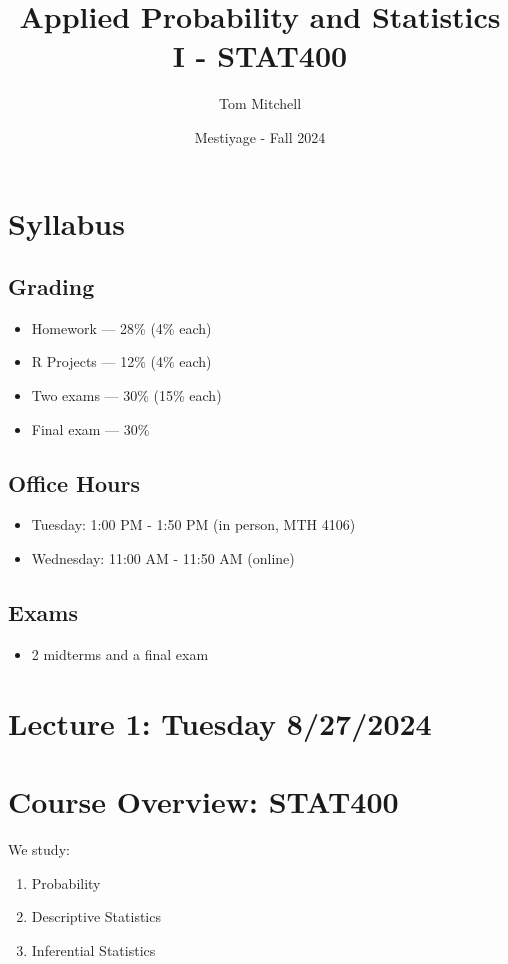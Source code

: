 \documentclass{article}
\title{Applied Probability and Statistics I - STAT400}
\author{Tom Mitchell}
\date{Mestiyage - Fall 2024}
\begin{document}
\maketitle

\section*{Syllabus}

\subsection*{Grading}
\begin{itemize}
    \item Homework — 28\% (4\% each)
    \item R Projects — 12\% (4\% each)
    \item Two exams — 30\% (15\% each)
    \item Final exam — 30\%
\end{itemize}

\subsection*{Office Hours}
\begin{itemize}
    \item Tuesday: 1:00 PM - 1:50 PM (in person, MTH 4106)
    \item Wednesday: 11:00 AM - 11:50 AM (online)
\end{itemize}

\subsection*{Exams}
\begin{itemize}
    \item 2 midterms and a final exam
\end{itemize}

\pagebreak

\section*{Lecture 1: Tuesday 8/27/2024}

\section*{Course Overview: STAT400}
We study:
\begin{enumerate}
    \item Probability
    \item Descriptive Statistics
    \item Inferential Statistics
\end{enumerate}
\end{document}
